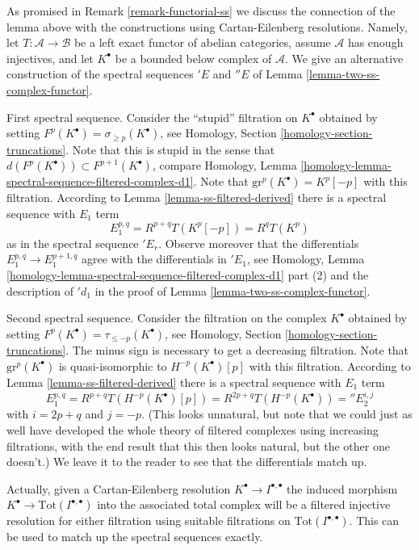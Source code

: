 \begin{remark}
\label{remark-final-functorial}
As promised in Remark \ref{remark-functorial-ss} we discuss the connection
of the lemma above with the constructions using Cartan-Eilenberg resolutions.
Namely, let $T : \mathcal{A} \to \mathcal{B}$ be a left exact functor
of abelian categories, assume $\mathcal{A}$
has enough injectives, and let $K^\bullet$ be a bounded below complex
of $\mathcal{A}$. We give an alternative construction of the
spectral sequences ${}'E$ and ${}''E$ of
Lemma \ref{lemma-two-ss-complex-functor}.

\medskip\noindent
First spectral sequence. Consider the ``stupid'' filtration on $K^\bullet$
obtained by setting $F^p(K^\bullet) = \sigma_{\geq p}(K^\bullet)$, see
Homology, Section \ref{homology-section-truncations}.
Note that this is stupid in the sense that
$d(F^p(K^\bullet)) \subset F^{p + 1}(K^\bullet)$, compare
Homology, Lemma \ref{homology-lemma-spectral-sequence-filtered-complex-d1}.
Note that $\text{gr}^p(K^\bullet) = K^p[-p]$ with this filtration.
According to Lemma \ref{lemma-ss-filtered-derived} there is a spectral sequence
with $E_1$ term
$$
E_1^{p, q} = R^{p + q}T(K^p[-p]) = R^qT(K^p)
$$
as in the spectral sequence ${}'E_r$. Observe moreover that the differentials
$E_1^{p, q} \to E_1^{p + 1, q}$ agree with the differentials in $'{}E_1$, see
Homology, Lemma
\ref{homology-lemma-spectral-sequence-filtered-complex-d1} part (2)
and the description of ${}'d_1$ in the proof of
Lemma \ref{lemma-two-ss-complex-functor}.

\medskip\noindent
Second spectral sequence. Consider the filtration on the complex $K^\bullet$
obtained by setting $F^p(K^\bullet) = \tau_{\leq -p}(K^\bullet)$, see
Homology, Section \ref{homology-section-truncations}.
The minus sign is necessary
to get a decreasing filtration. Note that
$\text{gr}^p(K^\bullet)$ is quasi-isomorphic to $H^{-p}(K^\bullet)[p]$
with this filtration. According to Lemma \ref{lemma-ss-filtered-derived}
there is a spectral sequence with $E_1$ term
$$
E_1^{p, q} = R^{p + q}T(H^{-p}(K^\bullet)[p])
= R^{2p + q}T(H^{-p}(K^\bullet)) = {}''E_2^{i, j}
$$
with $i = 2p + q$ and $j = -p$. (This looks unnatural, but note that we
could just as well have developed the whole theory of filtered complexes
using increasing filtrations, with the end result that this then looks
natural, but the other one doesn't.) We leave it to the reader to see
that the differentials match up.

\medskip\noindent
Actually, given a Cartan-Eilenberg resolution
$K^\bullet \to I^{\bullet, \bullet}$ the induced morphism
$K^\bullet \to \text{Tot}(I^{\bullet, \bullet})$
into the associated total complex
will be a filtered injective resolution for either filtration
using suitable filtrations on $\text{Tot}(I^{\bullet, \bullet})$.
This can be used
to match up the spectral sequences exactly.
\end{remark}






